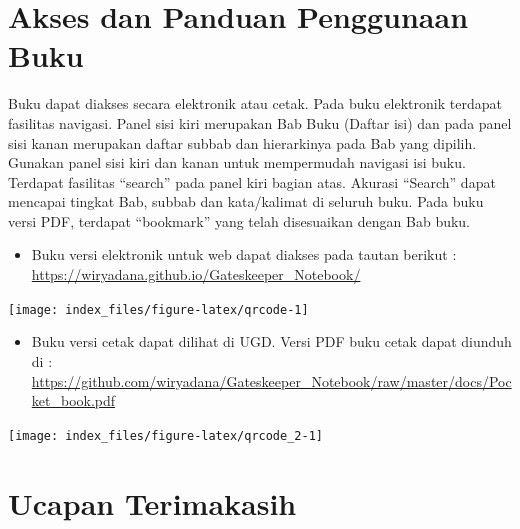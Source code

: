 \documentclass[
]{book}
\providecommand{\tightlist}{%
  \setlength{\itemsep}{0pt}\setlength{\parskip}{0pt}}
\begin{document}
\hypertarget{akses-dan-panduan-penggunaan-buku}{%
\section{Akses dan Panduan Penggunaan Buku}\label{akses-dan-panduan-penggunaan-buku}}

Buku dapat diakses secara elektronik atau cetak. Pada buku elektronik terdapat fasilitas navigasi. Panel sisi kiri merupakan Bab Buku (Daftar isi) dan pada panel sisi kanan merupakan daftar subbab dan hierarkinya pada Bab yang dipilih. Gunakan panel sisi kiri dan kanan untuk mempermudah navigasi isi buku. Terdapat fasilitas ``search'' pada panel kiri bagian atas. Akurasi ``Search'' dapat mencapai tingkat Bab, subbab dan kata/kalimat di seluruh buku. Pada buku versi PDF, terdapat ``bookmark'' yang telah disesuaikan dengan Bab buku.

\begin{itemize}
\tightlist
\item
  Buku versi elektronik untuk web dapat diakses pada tautan berikut : \url{https://wiryadana.github.io/Gateskeeper_Notebook/}
\end{itemize}

\begin{center}\texttt{[image: index\_files/figure-latex/qrcode-1]} \end{center}

\begin{itemize}
\tightlist
\item
  Buku versi cetak dapat dilihat di UGD. Versi PDF buku cetak dapat diunduh di : \url{https://github.com/wiryadana/Gateskeeper_Notebook/raw/master/docs/Pocket_book.pdf}
\end{itemize}

\begin{center}\texttt{[image: index\_files/figure-latex/qrcode\_2-1]} \end{center}

\hypertarget{ucapan-terimakasih}{%
\section{Ucapan Terimakasih}\label{ucapan-terimakasih}}
\end{document}
